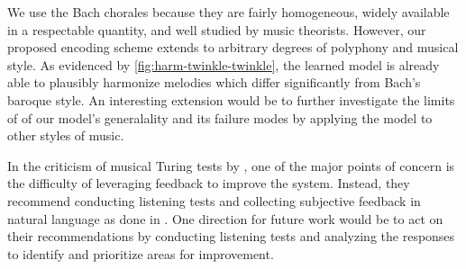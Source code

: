 We use the Bach chorales because they are fairly homogeneous, widely available
in a respectable quantity, and well studied by music theorists. However, our
proposed encoding scheme extends to arbitrary degrees of polyphony and musical
style. As evidenced by \vref{fig:harm-twinkle-twinkle}, the learned model is
already able to plausibly harmonize melodies which differ significantly from
Bach's baroque style. An interesting extension would be to further investigate
the limits of of our model's generalality and its failure modes by applying
the model to other styles of music.

In the criticism of musical Turing tests by \citet{ariza2009interrogator}, one
of the major points of concern is the difficulty of leveraging feedback to
improve the system. Instead, they recommend conducting listening tests and
collecting subjective feedback in natural language as done in
\citet{collins2016developing}. One direction for future work would be to
act on their recommendations by conducting listening tests and analyzing
the responses to identify and prioritize areas for improvement.

